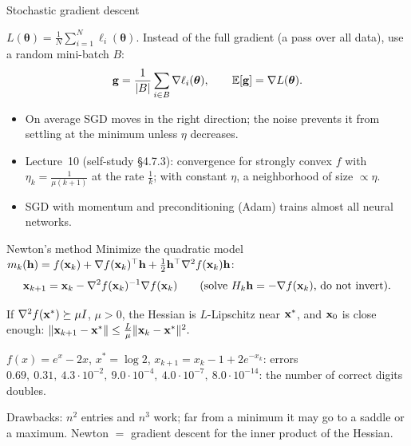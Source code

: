 \documentclass[aspectratio=1610,11pt]{beamer}
\begin{document}
\begin{frame}{Stochastic gradient descent}
    \begin{remark}
        \small $L(\boldsymbol{\theta}) = \frac{1}{N}\sum_{i=1}^N\ell_i(\boldsymbol{\theta})$. Instead of the full gradient (a pass over all data), use a random mini-batch $B$:
        \[\mathbf{g} = \frac{1}{|B|}\sum_{i \in B}\nabla\ell_i(\boldsymbol{\theta}), \qquad \mathbb{E}[\mathbf{g}] = \nabla L(\boldsymbol{\theta}).\]
    \end{remark}
    \small
    \begin{itemize}
        \item On average SGD moves in the right direction; the noise prevents it from settling at the minimum unless $\eta$ decreases.
        \item Lecture~10 (self-study \S4.7.3): convergence for strongly convex $f$ with $\eta_k = \frac{1}{\mu(k + 1)}$ at the rate $\frac{1}{k}$; with constant $\eta$, a neighborhood of size $\propto \eta$.
        \item SGD with momentum and preconditioning (Adam) trains almost all neural networks.
    \end{itemize}
\end{frame}

\begin{frame}{Newton's method}
    \small
    Minimize the quadratic model $m_k(\mathbf{h}) = f(\mathbf{x}_k) + \nabla f(\mathbf{x}_k)^\top\mathbf{h} + \frac{1}{2}\mathbf{h}^\top\nabla^2 f(\mathbf{x}_k)\mathbf{h}$:
    \[\mathbf{x}_{k+1} = \mathbf{x}_k - \nabla^2 f(\mathbf{x}_k)^{-1}\nabla f(\mathbf{x}_k) \qquad \text{(solve } H_k\mathbf{h} = -\nabla f(\mathbf{x}_k)\text{, do not invert)}.\]
    \begin{theorem}
        \small If $\nabla^2 f(\mathbf{x}^*) \succeq \mu I$, $\mu > 0$, the Hessian is $L$-Lipschitz near $\mathbf{x}^*$, and $\mathbf{x}_0$ is close enough:
        \(\lVert \mathbf{x}_{k+1} - \mathbf{x}^* \rVert \leq \frac{L}{\mu}\lVert \mathbf{x}_k - \mathbf{x}^* \rVert^2.\)
    \end{theorem}
    \begin{example}[][ex:newton]
        \small $f(x) = e^x - 2x$, $x^* = \log 2$, $x_{k+1} = x_k - 1 + 2e^{-x_k}$: errors $0.69,\ 0.31,\ 4.3 \cdot 10^{-2},\ 9.0 \cdot 10^{-4},\ 4.0 \cdot 10^{-7},\ 8.0 \cdot 10^{-14}$: the number of correct digits doubles.
    \end{example}
    Drawbacks: $n^2$ entries and $n^3$ work; far from a minimum it may go to a saddle or a maximum. Newton $=$ gradient descent for the inner product of the Hessian.
\end{frame}
\end{document}
